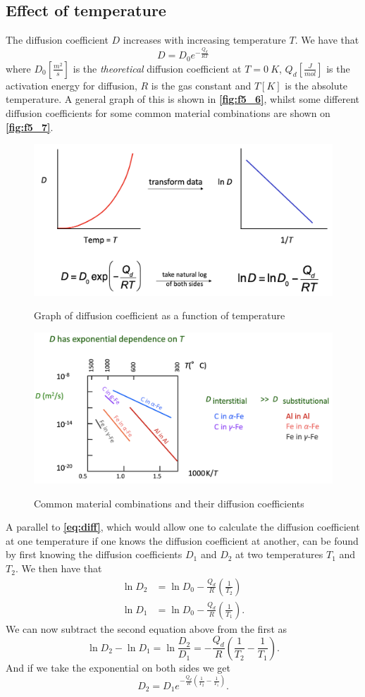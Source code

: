 \subsection{Effect of temperature}
The diffusion coefficient $D$ increases with increasing temperature $T$. We have that
\begin{equation} \label{eq:diff}
  D = D_0 e^{- \frac{Q_d}{RT}}
\end{equation}
where $D_0 [\unit{\frac{m^2}{s}}]$ is the \textit{theoretical} diffusion coefficient at $T = \qty{0}{K}$, $Q_d [\unit{\frac{J}{mol}}]$ is the activation energy for diffusion, $R$ is the gas constant and $T [\unit{K}]$ is the absolute temperature. A general graph of this is shown in \textbf{\autoref{fig:f5_6}}, whilst some different diffusion coefficients for some common material combinations are shown on \textbf{\autoref{fig:f5_7}}. 
\begin{figure} [ht]
  \centering
  \caption{Graph of diffusion coefficient as a function of temperature}
  \includegraphics[width=0.6\linewidth]{./figures/f5_6.png}
  \label{fig:f5_6}
\end{figure}
\begin{figure} [ht]
  \centering
  \caption{Common material combinations and their diffusion coefficients}
  \includegraphics[width=0.7\linewidth]{./figures/f5_7.png}
  \label{fig:f5_7}
\end{figure}
A parallel to \textbf{\autoref{eq:diff}}, which would allow one to calculate the diffusion coefficient at one temperature if one knows the diffusion coefficient at another, can be found by first knowing the diffusion coefficients $D_1$ and $D_2$ at two temperatures $T_1$ and $T_2$. We then have that
\begin{align*}
  \ln D_2 &= \ln D_0 - \frac{Q_d}{R} \left( \frac{1}{T_2} \right) \\
  \ln D_1 &= \ln D_0 - \frac{Q_d}{R} \left( \frac{1}{T_1} \right)
.\end{align*}
We can now subtract the second equation above from the first as
\[ 
  \ln D_2 - \ln D_1 = \ln \frac{D_2}{D_1} = - \frac{Q_d}{R} \left( \frac{1}{T_2} - \frac{1}{T_1} \right)
.\]
And if we take the exponential on both sides we get
\[ 
  D_2 = D_1 e^{- \frac{Q_d}{R} \left( \frac{1}{T_2} - \frac{1}{T_1} \right)}
.\]

